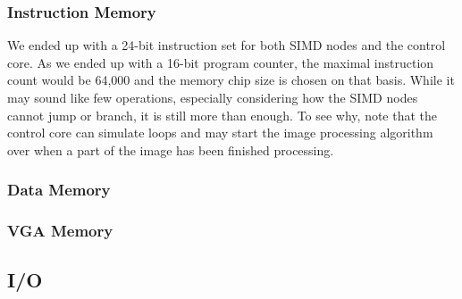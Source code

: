 \subsubsection*{Instruction Memory}

We ended up with a 24-bit instruction set for both \ac{SIMD} nodes and the
control core. As we ended up with a 16-bit program counter, the maximal
instruction count would be 64,000 and the memory chip size is chosen on that
basis. While it may sound like few operations, especially considering how the
\ac{SIMD} nodes cannot jump or branch, it is still more than enough. To see
why, note that the control core can simulate loops and may start the image
processing algorithm over when a part of the image has been finished processing.

\subsubsection*{Data Memory}

\subsubsection*{VGA Memory}

\subsection{I/O}

